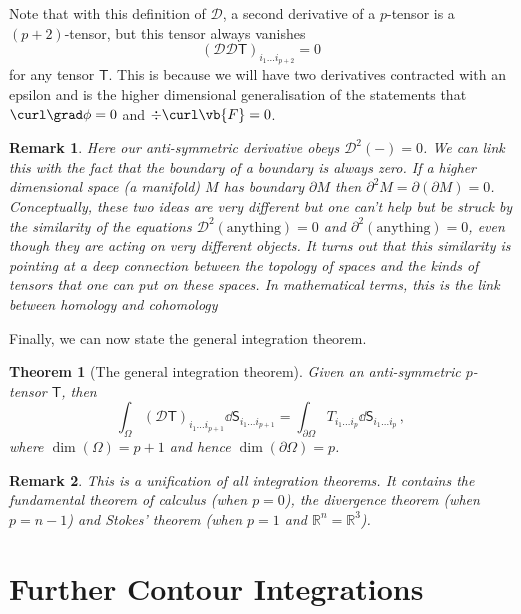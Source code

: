 \documentclass{article}
\theoremstyle{plain}\theoremheaderfont{\normalfont\itshape}\theorembodyfont{\rmfamily}\theoremseparator{.}\newtheorem*{rem}{Remark}\newtheorem*{ex}{Example}\newtheorem*{proof}{Proof}\newtheorem*{altp}{Alternative proof}
\theoremstyle{plain}\theoremheaderfont{\normalfont\bfseries}\theorembodyfont{\rmfamily}\theoremseparator{.}\newtheorem{thm}{Theorem}[section]\newtheorem{lem}[thm]{Lemma}\newtheorem{prop}[thm]{Proposition}\newtheorem*{cor}{Corollary}\newtheorem{defn}[thm]{Definition}\newtheorem{clm}[thm]{Claim}\newtheorem{clminproof}{Claim}
\theoremstyle{break}\theoremheaderfont{\normalfont\itshape}\theorembodyfont{\rmfamily}\theoremseparator{.\medskip}\newtheorem*{proofskip}{Proof}\newtheorem*{exs}{Examples}\newtheorem*{rems}{Remarks}
\theoremstyle{break}\theoremheaderfont{\normalfont\bfseries}\theorembodyfont{\rmfamily}\theoremseparator{.\medskip}\newtheorem{lemskip}[thm]{Lemma}\newtheorem{defnskip}[thm]{Definition}\newtheorem{propskip}[thm]{Proposition}\newtheorem{thmskip}[thm]{Theorem}
\numberwithin{equation}{section}
\begin{document}
	Note that with this definition of \(\mathcal{D}\), a second derivative of a \(p\)-tensor is a \((p+2)\)-tensor, but this tensor always vanishes
	\[(\mathcal{DD}\mathsf{T})_{i_1\dots i_{p+2}}=0\]
	for any tensor \(\mathsf{T}\). This is because we will have two derivatives contracted with an epsilon and is the higher dimensional generalisation of the statements that \(\curl\grad\phi=0\) and \(\div\curl\vb{F}=0\).
	\begin{rem}
		Here our anti-symmetric derivative obeys \(\mathcal{D}^2(-)=0\). We can link this with the fact that the boundary of a boundary is always zero. If a higher dimensional space (a manifold) \(M\) has boundary \(\partial M\) then \(\partial^2M=\partial(\partial M)=0\). Conceptually, these two ideas are very different but one can't help but be struck by the similarity of the equations \(\mathcal{D}^2(\text{anything})=0\) and \(\partial^2(\text{anything})=0\), even though they are acting on very different objects. It turns out that this similarity is pointing at a deep connection between the topology of spaces and the kinds of tensors that one can put on these spaces. In mathematical terms, this is the link between homology and cohomology
	\end{rem}
	Finally, we can now state the general integration theorem.
	\begin{thm}[The general integration theorem]
		Given an anti-symmetric \(p\)-tensor \(\mathsf{T}\), then
		\[\int_\Omega(\mathcal{D}\mathsf{T})_{i_1\dots i_{p+1}}\dd{\mathsf{S}_{i_1\dots i_{p+1}}}=\int_{\partial\Omega}T_{i_1\dots i_p}\dd{\mathsf{S}_{i_1\dots i_p}}\,,\]
		where \(\dim(\Omega)=p+1\) and hence \(\dim(\partial\Omega)=p\).
	\end{thm}
	\begin{rem}
		This is a unification of all integration theorems. It contains the fundamental theorem of calculus (when \(p=0\)), the divergence theorem (when \(p=n-1\)) and Stokes' theorem (when \(p=1\) and \(\mathbb{R}^n=\mathbb{R}^3\)). 
	\end{rem}
	
	\newpage

	\section{Further Contour Integrations}
\end{document}
